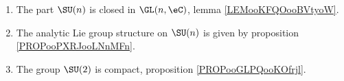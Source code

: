 
	\label{THEMEooSpecialUnitGroup}
\begin{enumerate}
	\item
	      The part \( \SU(n)\) is closed in \( \GL(n,\eC)\), lemma \ref{LEMooKFQOooBVtyoW}.
	\item
	      The analytic Lie group structure on \( \SU(n)\) is given by proposition \ref{PROPooPXRJooLNnMFn}.
	\item
	      The group \( \SU(2)\) is compact, proposition \ref{PROPooGLPQooKOfrjl}.
\end{enumerate}

